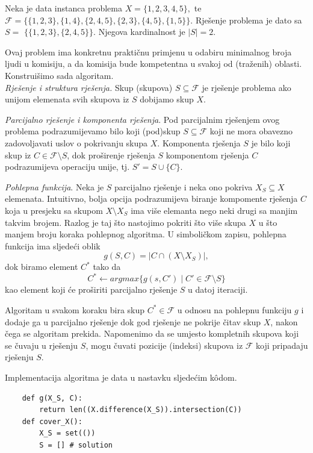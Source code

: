 \begin{solution}
	
	Neka je data instanca problema $X = \{1, 2, 3, 4, 5\},$ te $
	\mathcal{F} = \{\{1, 2, 3\}, \{1, 4\}, \{2, 4, 5\}, \{2, 3\}, \{4, 5\}, \{1, 5\}\}$. 
	Rješenje problema je dato sa $S =$ $ \{\{1, 2, 3\}, \{2, 4, 5\}\}$. Njegova kardinalnost je $|S| = 2$.
	
	Ovaj problem ima konkretnu praktičnu primjenu u odabiru minimalnog broja ljudi u komisiju, a da komisija bude kompetentna u svakoj od (traženih) oblasti. Konstruišimo sada algoritam. \\
\textit{Rješenje i struktura rješenja.} Skup (skupova) $S \subseteq \mathcal{F}$ je rješenje problema ako unijom elemenata svih skupova iz $S$ dobijamo skup $X$. 

\textit{Parcijalno rješenje i komponenta rješenja}. Pod parcijalnim rješenjem ovog problema podrazumijevamo bilo koji (pod)skup $S \subseteq \mathcal{F}$ koji ne mora obavezno zadovoljavati uslov o pokrivanju skupa $X$.  Komponenta rješenja $S$ je bilo koji skup iz $C \in \mathcal{F} \setminus S $, dok proširenje rješenja $S$ komponentom rješenja $C$ podrazumijeva operaciju unije, tj. $S' = S \cup \{ C \} $.

\textit{Pohlepna funkcija}. Neka je $S$ parcijalno rješenje i neka ono pokriva $X_S \subseteq X$ elemenata. Intuitivno, bolja opcija podrazumijeva biranje kompomente rješenja $C$ koja u presjeku sa skupom $X \setminus X_S$ ima više elemanta  nego neki drugi sa manjim takvim brojem. Razlog je taj što nastojimo pokriti što više skupa $X$ u što manjem broju koraka pohlepnog algoritma. U simboličkom zapisu, pohlepna funkcija ima sljedeći oblik
$$ g(S, C) = | C \cap ( X \setminus X_S) |,$$
dok biramo element $C^*$ tako da 
$$ C^* \gets argmax \{ g(s, C') \mid C'\in \mathcal{F} \setminus S\} $$
kao element koji će proširiti parcijalno rješenje $S$ u datoj iteraciji.


Algoritam u svakom koraku bira skup $C^*\in \mathcal{F}$ u odnosu na pohlepnu funkciju $g$  i dodaje ga u parcijalno rješenje dok god   rješenje ne pokrije čitav skup $X$, nakon čega se algoritam prekida. Napomenimo da se umjesto kompletnih skupova koji se čuvaju u rješenju $S$, mogu čuvati pozicije (indeksi) skupova iz $\mathcal{F}$ koji pripadaju rješenju $S$. 

Implementacija algoritma  je data u nastavku sljedećim k\^odom.

\begin{verbatim}
	def g(X_S, C):
		return len((X.difference(X_S)).intersection(C))
	def cover_X():
		X_S = set(())
		S = [] # solution
	

\end{verbatim}
\end{solution}
